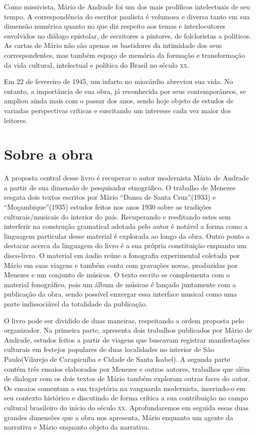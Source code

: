 Como missivista, Mário de Andrade foi um dos mais prolíficos
intelectuais de seu tempo. A correspondência do escritor paulista é
volumosa e diversa tanto em sua dimensão numérica quanto no que diz
respeito aos temas e interlocutores envolvidos no diálogo epistolar, de
escritores a pintores, de folcloristas a políticos. As cartas de Mário
não são apenas os bastidores da intimidade dos seus correspondentes, mas
também espaço de memória da formação e transformação da vida cultural,
intelectual e política do Brasil no século \textsc{xx}.

Em 22 de fevereiro de 1945, um infarto no miocárdio abreviou sua vida.
No entanto, a importância de sua obra, já reconhecida por seus
contemporâneos, se ampliou ainda mais com o passar dos anos, sendo hoje
objeto de estudos de variadas perspectivas críticas e suscitando um
interesse cada vez maior dos leitores.

\section{Sobre a obra}

A proposta central desse livro é recuperar o autor modernista Mário de
Andrade a partir de sua dimensão de pesquisador etnográfico. O trabalho
de Menezes resgata dois textos escritos por Mário ``Dansa de Santa
Cruz''(1933) e ``Moçambique''(1935) estudos feitos nos anos 1930 sobre
as tradições culturais/musicais do interior do país. Recuperando e
reeditando estes sem interferir na construção gramatical adotada pelo
autor é notável a forma como a linguagem particular desse material é
explorada ao longo da obra. Outro ponto a destacar acerca da linguagem
do livro é a sua própria constituição enquanto um disco-livro. O
material em áudio reúne a fonografia experimental coletada por Mário em
suas viagens e também conta com gravações novas, produzidas por Menezes
e um conjunto de músicos. O texto escrito se complementa com o material
fonográfico, pois um álbum de músicas é lançado juntamente com a
publicação da obra, sendo possível enxergar essa interface musical como
uma parte indissociável da totalidade da publicação.

O livro pode ser dividido de duas maneiras, respeitando a ordem proposta
pelo organizador. Na primeira parte, apresenta dois trabalhos publicados
por Mário de Andrade, estudos feitos a partir de viagens que buscavam
registrar manifestações culturais em festejos populares de duas
localidades no interior de São Paulo(Vilarejo de Carapicuíba e Cidade de
Santa Isabel). A segunda parte contém três ensaios elaborados por
Menezes e outros autores, trabalhos que além de dialogar com os dois
textos de Mário também exploram outras faces do autor. Os ensaios
comentam a sua trajetória na vanguarda modernista, inserindo-o em seu
contexto histórico e discutindo de forma crítica a sua contribuição no
campo cultural brasileiro do início do século \textsc{xx}. Aprofundaremos em
seguida essas duas grandes dimensões que a obra nos apresenta, Mário
enquanto um agente da narrativa e Mário enquanto objeto da narrativa.

